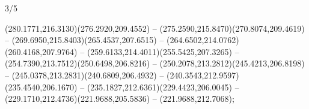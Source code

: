\begin{flagdescription}{3/5}
\begin{scope}[scale=0.00214\flagwidth,yshift=162mm]
\begin{scope}[y=-0.8pt, x=0.8pt, inner sep=0pt, outer sep=0pt]
\begin{scope}[draw,fill=gold,line join=round,line cap=round,line width=0.0025\flagwidth]
\begin{scope}[line width=0.0025\flagwidth]
(280.1771,216.3130)(276.2920,209.4552) -- (275.2590,215.8470)(270.8074,209.4619) --
(269.6950,215.8403)(265.4537,207.6515) -- (264.6502,214.0762)(260.4168,207.9764) --
(259.6133,214.4011)(255.5425,207.3265) -- (254.7390,213.7512)(250.6498,206.8216) --
(250.2078,213.2812)(245.4213,206.8198) -- (245.0378,213.2831)(240.6809,206.4932) --
(240.3543,212.9597)(235.4540,206.1670) --  (235.1827,212.6361)(229.4423,206.0045) --
(229.1710,212.4736)(221.9688,205.5836) -- (221.9688,212.7068);
\end{scope}
\end{scope}
\end{scope}
\end{scope}
\fi
\framecode{}
\end{flagdescription}
